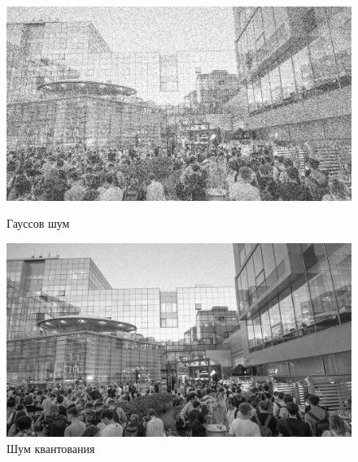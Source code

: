 \documentclass[a4paper]{article}
\begin{document}
\begin{figure}[H]
    \begin{minipage}{0.49\textwidth}
        \centering \includegraphics[width=\textwidth]{images/1_noise/gaussian.jpg}
        \caption{Гауссов шум}
    \end{minipage}\hfill
    \begin{minipage}{0.49\textwidth}
        \centering \includegraphics[width=\textwidth]{images/1_noise/poisson.jpg}
        \caption{Шум квантования}
    \end{minipage}
\end{figure}\,
\end{document}
